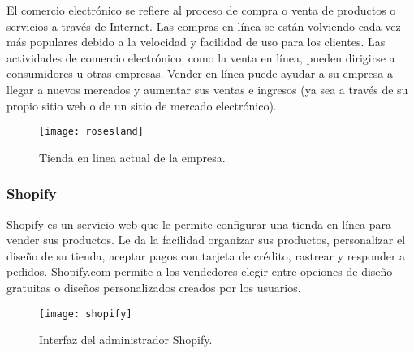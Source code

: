 El comercio electrónico se refiere al proceso de compra o venta de productos o servicios a través de Internet. Las compras en línea se están volviendo cada vez más populares debido a la velocidad y facilidad de uso para los clientes. Las actividades de comercio electrónico, como la venta en línea, pueden dirigirse a consumidores u otras empresas. Vender en línea puede ayudar a su empresa a llegar a nuevos mercados y aumentar sus ventas e ingresos (ya sea a través de su propio sitio web o de un sitio de mercado electrónico).

\begin{figure}[H]
  \centering
  \texttt{[image: rosesland]}
  \caption{Tienda en linea actual de la empresa.}
\end{figure}

\subsubsection{Shopify}
Shopify es un servicio web que le permite configurar una tienda en línea para vender sus productos. 
Le da la facilidad organizar sus productos, personalizar el diseño de su tienda, 
aceptar pagos con tarjeta de crédito, rastrear y responder a pedidos. 
Shopify.com permite a los vendedores elegir entre opciones de diseño gratuitas 
o diseños personalizados creados por los usuarios.

\begin{figure}[H]
  \centering
  \texttt{[image: shopify]}
  \caption{Interfaz del administrador Shopify.}
\end{figure}